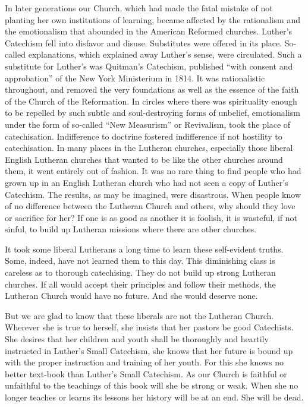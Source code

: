 In later generations our Church, which had made the fatal mistake of not planting her own institutions
of learning, became affected by the rationalism and the emotionalism that abounded in the American Reformed churches. Luther’s Catechism fell into disfavor and disuse.  Substitutes were offered in its place. So-called explanations, which explained away Luther’s sense, were circulated. Such a substitute for Luther’s was Quitman’s Catechism, published “with consent and approbation” of the New York Ministerium in 1814. It was rationalistic throughout, and removed the very foundations as well as the essence of the faith of the Church of the Reformation. In circles where there was spirituality enough to be repelled by such subtle and soul-destroying forms of unbelief, emotionalism under the form of so-called “New Measurism” or Revivalism, took the place of catechisation. Indifference to doctrine fostered indifference if not hostility to catechisation. In many places in the Lutheran churches, especially those liberal English Lutheran churches that wanted to be like the other churches around them, it went entirely out of fashion. It was no rare thing to find people who had grown up in an English Lutheran church who had not seen a copy of Luther’s Catechism. The results, as may be imagined, were disastrous. When people know of no difference between the Lutheran Church and others, why should they love or sacrifice for her?  If one is as good as another it is foolish,
it is wasteful, if not sinful, to build up Lutheran missions where there are other churches.

It took some liberal Lutherans a long time to learn these self-evident truths. Some, indeed, have not learned them to this day. This diminishing class is careless as to thorough catechising. They do not build up strong Lutheran churches. If all would accept their principles and follow their methods, the Lutheran Church would have no future. And she would deserve none.

But we are glad to know that these liberals are not the Lutheran Church. Wherever she is true to herself, she insists that her pastors be good Catechists.  She desires that her children and youth shall be thoroughly and heartily instructed in Luther’s Small Catechism, she knows that her future is bound up with the proper instruction and training of her youth. For this she knows no better text-book than Luther’s Small Catechism. As our Church is faithful or unfaithful to the teachings of this book will she be strong or weak. When she no longer teaches or learns its lessons her history will be at an end. She will be dead.
